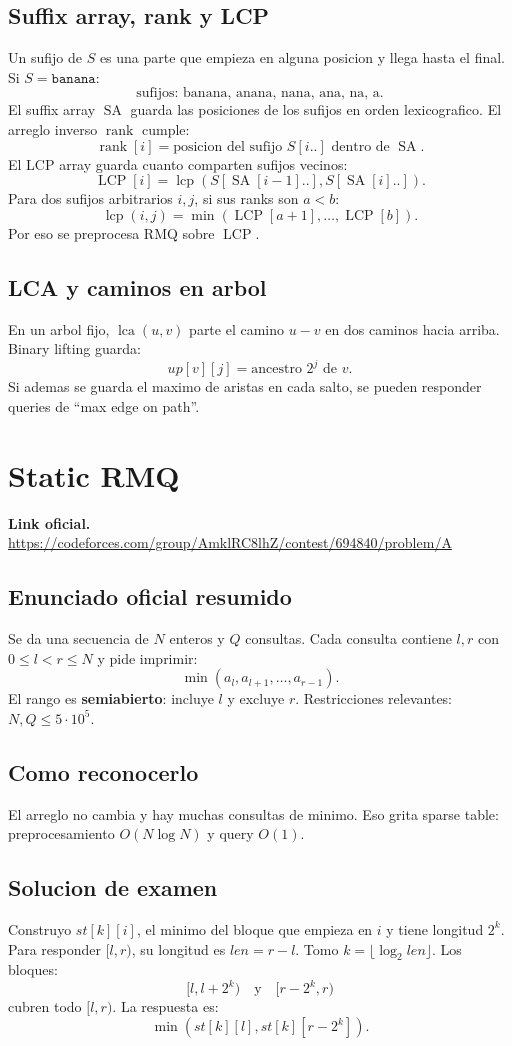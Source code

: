 \documentclass[10pt]{article}
\newcommand{\bigO}{O}
\newcommand{\SA}{\operatorname{SA}}
\newcommand{\LCP}{\operatorname{LCP}}
\newcommand{\rankv}{\operatorname{rank}}
\newcommand{\lca}{\operatorname{lca}}
\newcommand{\lcp}{\operatorname{lcp}}
\begin{document}
\subsection{Suffix array, rank y LCP}
Un sufijo de $S$ es una parte que empieza en alguna posicion y llega hasta el
final. Si $S=\texttt{banana}$:
\[
\text{sufijos: banana, anana, nana, ana, na, a.}
\]
El suffix array $\SA$ guarda las posiciones de los sufijos en orden
lexicografico. El arreglo inverso $\rankv$ cumple:
\[
\rankv[i]=\text{posicion del sufijo }S[i..]\text{ dentro de }\SA.
\]
El LCP array guarda cuanto comparten sufijos vecinos:
\[
\LCP[i]=\lcp(S[\SA[i-1]..],S[\SA[i]..]).
\]
Para dos sufijos arbitrarios $i,j$, si sus ranks son $a<b$:
\[
\lcp(i,j)=\min(\LCP[a+1],\ldots,\LCP[b]).
\]
Por eso se preprocesa RMQ sobre $\LCP$.

\subsection{LCA y caminos en arbol}
En un arbol fijo, $\lca(u,v)$ parte el camino $u-v$ en dos caminos hacia arriba.
Binary lifting guarda:
\[
up[v][j]=\text{ancestro }2^j\text{ de }v.
\]
Si ademas se guarda el maximo de aristas en cada salto, se pueden responder
queries de ``max edge on path''.

\newpage

\section{Static RMQ}
\textbf{Link oficial.} \url{https://codeforces.com/group/AmklRC8lhZ/contest/694840/problem/A}

\subsection{Enunciado oficial resumido}
Se da una secuencia de $N$ enteros y $Q$ consultas. Cada consulta contiene
$l,r$ con $0\le l<r\le N$ y pide imprimir:
\[
\min(a_l,a_{l+1},\ldots,a_{r-1}).
\]
El rango es \textbf{semiabierto}: incluye $l$ y excluye $r$. Restricciones
relevantes: $N,Q\le 5\cdot 10^5$.

\subsection{Como reconocerlo}
El arreglo no cambia y hay muchas consultas de minimo. Eso grita sparse table:
preprocesamiento $\bigO(N\log N)$ y query $\bigO(1)$.

\subsection{Solucion de examen}
Construyo $st[k][i]$, el minimo del bloque que empieza en $i$ y tiene longitud
$2^k$. Para responder $[l,r)$, su longitud es $len=r-l$. Tomo
$k=\lfloor\log_2 len\rfloor$. Los bloques:
\[
[l,l+2^k)\quad\text{y}\quad [r-2^k,r)
\]
cubren todo $[l,r)$. La respuesta es:
\[
\min(st[k][l],st[k][r-2^k]).
\]
\end{document}
